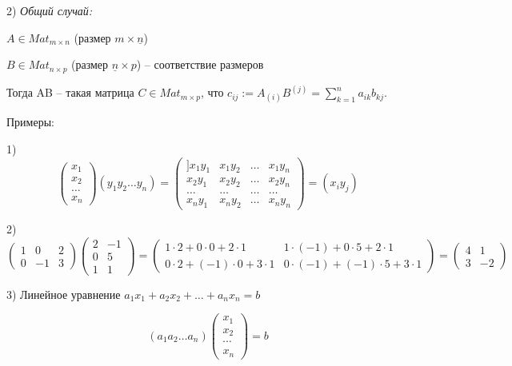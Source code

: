 2) \textit{Общий случай:}

$A \in Mat_{m \times n}$ (размер $m \times \underline{n}$)

$B \in Mat_{n \times p}$ (размер $\underline{n} \times p$) -- соответствие размеров

\vspace{\baselineskip}
Тогда AB -- такая матрица $C \in Mat_{m \times p}$, что $c_{ij} := A_{(i)}B^{(j)} = \sum\limits_{k=1}^n a_{ik} b_{kj}$.

Примеры:

1) \begin{equation*} \begin{pmatrix} x_1 \\ x_2 \\ \dots \\ x_n \end{pmatrix} (y_1 y_2 \dots y_n) = \begin{pmatrix}]
x_1 y_1 & x_1 y_2 & \dots & x_1 y_n \\
x_2 y_1 & x_2 y_2 & \dots & x_2 y_n \\
\dots & \dots & \dots & \dots \\
x_n y_1 & x_n y_2 & \dots & x_n y_n
\end{pmatrix} = (x_i y_j) \end{equation*}

2) \begin{equation*}\begin{pmatrix}
1 & 0 & 2 \\
0 & -1 & 3
\end{pmatrix} \begin{pmatrix}
2 & -1 \\
0 & 5 \\
1 & 1
\end{pmatrix} = \begin{pmatrix}
1 \cdot 2 + 0 \cdot 0 + 2 \cdot 1 & 1 \cdot (-1) + 0 \cdot 5 + 2 \cdot 1 \\
0 \cdot 2 + (-1) \cdot 0 + 3 \cdot 1 & 0 \cdot (-1) + (-1) \cdot 5 + 3 \cdot 1 \end{pmatrix} = \begin{pmatrix}
4 & 1 \\
3 & -2 \end{pmatrix} \end{equation*}

3) Линейное уравнение $a_1 x_1 + a_2 x_2 + \dots + a_n x_n = b$

\begin{equation*}(a_1 a_2 \dots a_n) \begin{pmatrix}
    x_1 \\
    x_2 \\
    \cdots \\
   x_n
	\end{pmatrix} = b
\end{equation*}

